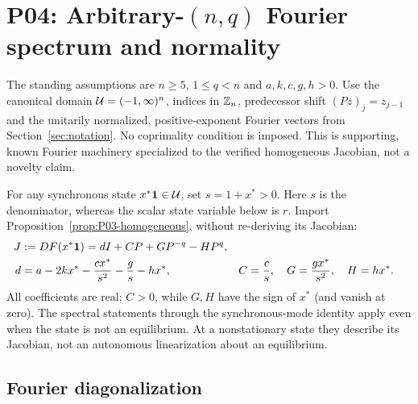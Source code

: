 \section{P04: Arbitrary-\texorpdfstring{$(n,q)$}{(n,q)} Fourier spectrum and normality}
\label{sec:P04}
The standing assumptions are $n\ge5$, $1\le q<n$ and
$a,k,c,g,h>0$. Use the canonical domain $\mathcal{U}=(-1,\infty)^n$,
indices in $\mathbb{Z}_n$, predecessor shift $(Pz)_j=z_{j-1}$ and the
unitarily normalized, positive-exponent Fourier vectors from
Section~\ref{sec:notation}. No coprimality condition is imposed.
This is supporting, known Fourier machinery specialized to the
verified homogeneous Jacobian, not a novelty claim.

For any synchronous state $x^*\mathbf{1}\in\mathcal{U}$, set $s=1+x^*>0$.
Here $s$ is the denominator, whereas the scalar state variable below
is $r$. Import Proposition~\ref{prop:P03-homogeneous}, without
re-deriving its Jacobian:
\begin{align}
 J&:=DF(x^*\mathbf{1})=dI+CP+GP^{-q}-HP^q,\label{eq:P04-input}\\
 d&=a-2kx^*-\frac{cx^*}{s^2}-\frac{g}{s}-hx^*,
 &C&=\frac{c}{s},\quad G=\frac{gx^*}{s^2},\quad H=hx^*.
 \label{eq:P04-coefficients}
\end{align}
All coefficients are real; $C>0$, while $G,H$ have the sign of
$x^*$ (and vanish at zero). The spectral statements through the
synchronous-mode identity apply even when the state is not an
equilibrium. At a nonstationary state they describe its Jacobian,
not an autonomous linearization about an equilibrium.

\subsection{Fourier diagonalization}
\label{slot:P04-1}

